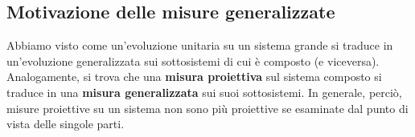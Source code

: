 \documentclass[../../InformazioneQuantistica.tex]{subfiles}
\begin{document}
\subsection{Motivazione delle misure generalizzate}
Abbiamo visto come un'evoluzione unitaria su un sistema grande si traduce in un'evoluzione generalizzata sui sottosistemi di cui è composto (e viceversa).\\
Analogamente, si trova che una \textbf{misura proiettiva} sul sistema composto si traduce in una \textbf{misura generalizzata} sui suoi sottosistemi. In generale, perciò, misure proiettive su un sistema non sono più proiettive se esaminate dal punto di vista delle singole parti.\\


\begin{figure}[H]
    \centering
    
\end{figure}
\end{document}
